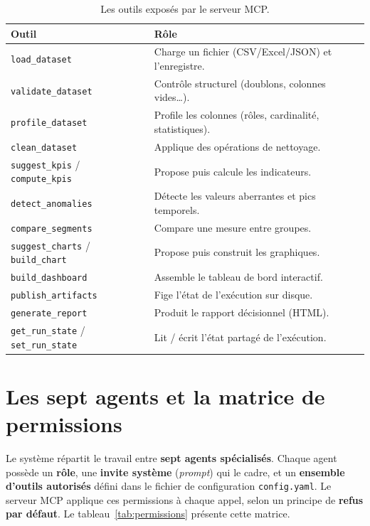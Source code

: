 \begin{table}[ht]
\centering\small
\caption{Les outils exposés par le serveur MCP.}
\label{tab:outils}
\begin{tabularx}{\linewidth}{@{}lY@{}}
\toprule
\textbf{Outil} & \textbf{Rôle} \\
\midrule
\texttt{load\_dataset} & Charge un fichier (CSV/Excel/JSON) et l'enregistre. \\
\texttt{validate\_dataset} & Contrôle structurel (doublons, colonnes vides…). \\
\texttt{profile\_dataset} & Profile les colonnes (rôles, cardinalité, statistiques). \\
\texttt{clean\_dataset} & Applique des opérations de nettoyage. \\
\texttt{suggest\_kpis} / \texttt{compute\_kpis} & Propose puis calcule les indicateurs. \\
\texttt{detect\_anomalies} & Détecte les valeurs aberrantes et pics temporels. \\
\texttt{compare\_segments} & Compare une mesure entre groupes. \\
\texttt{suggest\_charts} / \texttt{build\_chart} & Propose puis construit les graphiques. \\
\texttt{build\_dashboard} & Assemble le tableau de bord interactif. \\
\texttt{publish\_artifacts} & Fige l'état de l'exécution sur disque. \\
\texttt{generate\_report} & Produit le rapport décisionnel (HTML). \\
\texttt{get\_run\_state} / \texttt{set\_run\_state} & Lit / écrit l'état partagé de l'exécution. \\
\bottomrule
\end{tabularx}
\end{table}

\section{Les sept agents et la matrice de permissions}
Le système répartit le travail entre \textbf{sept agents spécialisés}. Chaque
agent possède un \textbf{rôle}, une \textbf{invite système} (\textit{prompt})
qui le cadre, et un \textbf{ensemble d'outils autorisés} défini dans le
fichier de configuration \texttt{config.yaml}. Le serveur MCP applique ces
permissions à chaque appel, selon un principe de \textbf{refus par défaut}.
Le tableau~\ref{tab:permissions} présente cette matrice.

